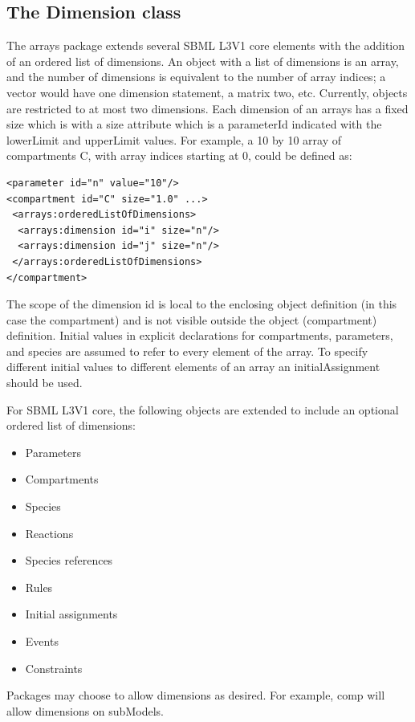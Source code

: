 \subsection{The Dimension class}



The arrays package extends several SBML L3V1 core elements with the addition of an ordered list of dimensions.  An object with a list of dimensions is an array, and the number of dimensions is equivalent to the number of array indices; a vector would have one dimension statement, a matrix two, etc.  Currently, objects are restricted to at most two dimensions.  Each dimension of an arrays has a fixed size which is with a size attribute which is a parameterId indicated with the lowerLimit and upperLimit values.  For example, a 10 by 10 array of compartments C, with array indices starting at 0, could be defined as:
\begin{verbatim} 
<parameter id="n" value="10"/>
<compartment id="C" size="1.0" ...>
 <arrays:orderedListOfDimensions>
  <arrays:dimension id="i" size="n"/>
  <arrays:dimension id="j" size="n"/>
 </arrays:orderedListOfDimensions>
</compartment>
\end{verbatim}
The scope of the dimension id is local to the enclosing object definition  (in this case the compartment) and is not visible outside the object  (compartment) definition.  
Initial values in explicit declarations for compartments, parameters, and species are assumed to refer to every element of the array.  To specify different initial values to different elements of an array an initialAssignment should be used. 

For SBML L3V1 core, the following objects are extended to include an optional ordered list of dimensions:
\begin{itemize}
\item Parameters
\item Compartments
\item Species
\item Reactions
\item Species references
\item Rules
\item Initial assignments
\item Events
\item Constraints
\end{itemize}
Packages may choose to allow dimensions as desired.  For example, comp will allow dimensions on subModels.

